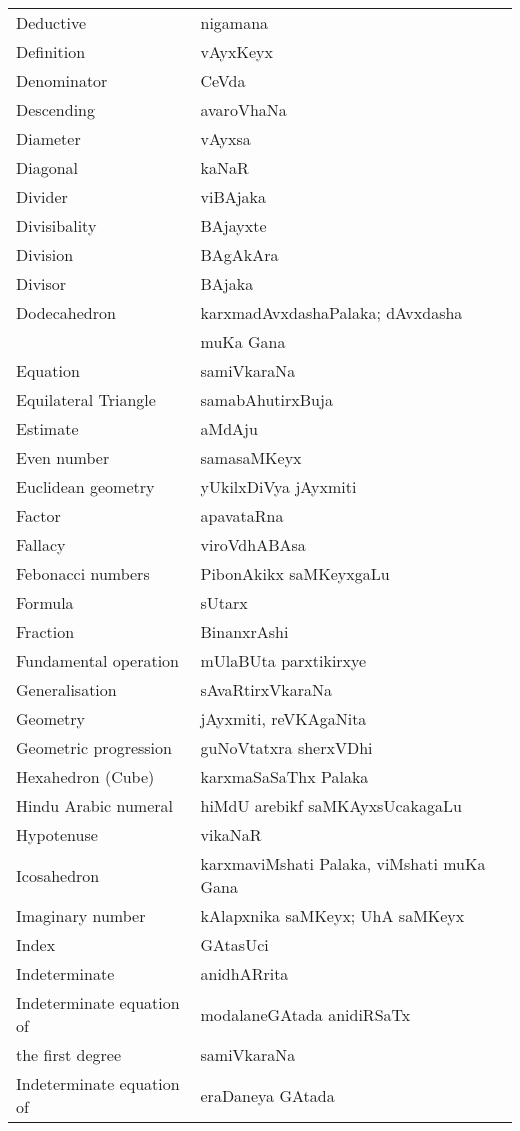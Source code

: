 {\begin{longtable}{>{\rm}l@{\hspace{1cm}}l}
Deductive & nigamana\\
Definition & vAyxKeyx\\
Denominator & CeVda\\
Descending & avaroVhaNa\\
Diameter & vAyxsa\\
Diagonal & kaNaR\\
Divider & viBAjaka\\
Divisibality & BAjayxte\\
Division & BAgAkAra\\
Divisor & BAjaka\\
Dodecahedron & karxmadAvxdashaPalaka; dAvxdasha\\[-0.1cm]
& muKa Gana\\
Equation & samiVkaraNa\\
Equilateral Triangle & samabAhutirxBuja\\
Estimate & aMdAju\\
Even number & samasaMKeyx\\
Euclidean geometry & yUkilxDiVya jAyxmiti\\
Factor & apavataRna\\
Fallacy & viroVdhABAsa\\
Febonacci numbers & PibonAkikx saMKeyxgaLu\\
Formula & sUtarx\\
Fraction & BinanxrAshi\\
Fundamental operation & mUlaBUta parxtikirxye\\
Generalisation & sAvaRtirxVkaraNa\\
Geometry & jAyxmiti, reVKAgaNita\\
Geometric progression & guNoVtatxra sherxVDhi\\
Hexahedron (Cube) & karxmaSaSaThx Palaka\\
Hindu Arabic numeral & hiMdU arebikf saMKAyxsUcakagaLu\\
Hypotenuse & vikaNaR\\
Icosahedron & karxmaviMshati Palaka, viMshati muKa Gana\\
Imaginary number  & kAlapxnika saMKeyx; UhA saMKeyx\\
Index & GAtasUci\\
Indeterminate & anidhARrita\\
Indeterminate equation of & modalaneGAtada anidiRSaTx\\[-0.1cm]
the first degree & samiVkaraNa\\
Indeterminate equation of & eraDaneya GAtada\\[-0.1cm] 

\end{longtable}}

